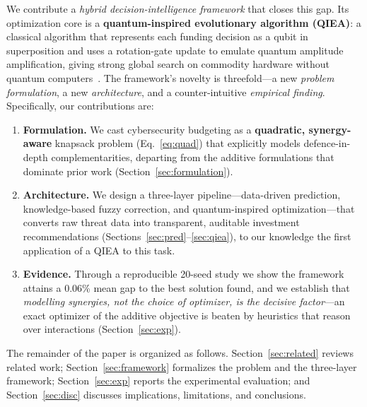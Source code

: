 \documentclass[preprint,12pt]{elsarticle}
\begin{document}
We contribute a \emph{hybrid decision-intelligence framework} that closes this gap.
Its optimization core is a \textbf{quantum-inspired evolutionary algorithm (QIEA)}: a
classical algorithm that represents each funding decision as a qubit in superposition
and uses a rotation-gate update to emulate quantum amplitude amplification, giving
strong global search on commodity hardware without quantum
computers~\cite{han2002,zhang2021}. The framework's novelty is threefold---a new
\emph{problem formulation}, a new \emph{architecture}, and a counter-intuitive
\emph{empirical finding}. Specifically, our contributions are:
\begin{enumerate}
\item \textbf{Formulation.} We cast cybersecurity budgeting as a \textbf{quadratic,
synergy-aware} knapsack problem (Eq.~\ref{eq:quad}) that explicitly models
defence-in-depth complementarities, departing from the additive formulations that
dominate prior work (Section~\ref{sec:formulation}).
\item \textbf{Architecture.} We design a three-layer pipeline---data-driven
prediction, knowledge-based fuzzy correction, and quantum-inspired
optimization---that converts raw threat data into transparent, auditable investment
recommendations (Sections~\ref{sec:pred}--\ref{sec:qiea}), to our knowledge the first
application of a QIEA to this task.
\item \textbf{Evidence.} Through a reproducible 20-seed study we show the framework
attains a 0.06\% mean gap to the best solution found, and we establish that
\emph{modelling synergies, not the choice of optimizer, is the decisive
factor}---an exact optimizer of the additive objective is beaten by heuristics that
reason over interactions (Section~\ref{sec:exp}).
\end{enumerate}
The remainder of the paper is organized as follows. Section~\ref{sec:related} reviews
related work; Section~\ref{sec:framework} formalizes the problem and the three-layer
framework; Section~\ref{sec:exp} reports the experimental evaluation; and
Section~\ref{sec:disc} discusses implications, limitations, and conclusions.
\end{document}
